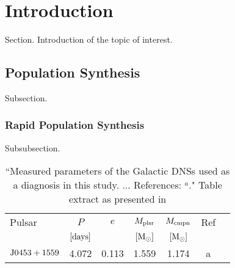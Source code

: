 \section{Introduction}
\label{sec:chap2:Introduction}
Section. Introduction of the topic of interest.

\subsection{Population Synthesis}
\label{subsec:chap2:popSynth}
Subsection.

\subsubsection{Rapid Population Synthesis}
\label{subsubsec:chap2:rapidPopSynth}
Subsubsection.

\begin{table}
\centering
\caption[Selection of observed properties of Galactic DNSs]{``Measured parameters of the Galactic \acp{DNS} used as a diagnosis in this study. ...
References: $^a$\citet{martinez2015pulsar}." Table extract as presented in \citealt{VignaGomez2018DNSs}} 
\label{tab:chap2:DNS}
\begin{tabular}{lcccccc}
\hline
Pulsar & $P$ & $e$ & $M_{\rm plsr}$  & $M_{\rm cmpn}$ & Ref \\
& $\rm [days]$ & & $\rm [M_{\odot}]$ & $\rm [M_{\odot}]$ &  \\
\hline
$\rm J0453+1559$ 			&	4.072	&	0.113	&	1.559	&	1.174	&	a	\\	
\end{tabular}
\end{table}